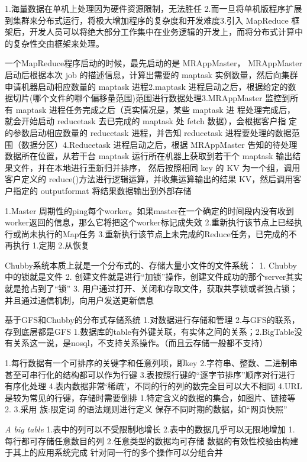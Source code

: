 \documentclass[twoside]{ctexart}
\begin{document}
\begin{multicols}{2}
  1.海量数据在单机上处理因为硬件资源限制，无法胜任 2.而一旦将单机版程序扩展到集群来分布式运行，将极大增加程序的复杂度和开发难度3.引入 MapReduce 框架后，开发人员可以将绝大部分工作集中在业务逻辑的开发上，而将分布式计算中的复杂性交由框架来处理。
  
  一个MapReduce程序启动的时候，最先启动的是 MRAppMaster， MRAppMaster 启动后根据本次 job 的描述信息，计算出需要的 maptask 实例数量，然后向集群申请机器启动相应数量的 maptask 进程2.maptask 进程启动之后，根据给定的数据切片(哪个文件的哪个偏移量范围)范围进行数据处理3.MRAppMaster 监控到所有 maptask 进程任务完成之后（真实情况是，某些 maptask 进 程处理完成后，就会开始启动 reducetask 去已完成的 maptask 处 fetch 数据），会根据客户指 定的参数启动相应数量的 reducetask 进程，并告知 reducetask 进程要处理的数据范围（数据分区）4.Reducetask 进程启动之后，根据 MRAppMaster 告知的待处理数据所在位置，从若干台 maptask 运行所在机器上获取到若干个 maptask 输出结果文件，并在本地进行重新归并排序， 然后按照相同 key 的 KV 为一个组，调用客户定义的 reduce()方法进行逻辑运算，并收集运算输出的结果 KV，然后调用客户指定的 outputformat 将结果数据输出到外部存储

   1.Master 周期性的ping每个worker。如果master在一个确定的时间段内没有收到worker返回的信息，那么它将把这个worker标记成失效 2.重新执行该节点上已经执行或尚未执行的Map任务 3.重新执行该节点上未完成的Reduce任务，已完成的不再执行   1.定期 2.从恢复

    Chubby系统本质上就是一个分布式的、存储大量小文件的文件系统：
    1. Chubby中的锁就是文件
    2. 创建文件就是进行“加锁”操作，创建文件成功的那个server其实就是抢占到了“锁”
    3. 用户通过打开、关闭和存取文件，获取共享锁或者独占锁；并且通过通信机制，向用户发送更新信息
    
  
    基于GFS和Chubby的分布式存储系统 1.对数据进行存储和管理 2.与GFS的联系，存到底层都是GFS  1.数据库的table有外键关联，有实体之间的关系；2.BigTable没有关系这一说，是nosql，不支持关系操作。（而且云存储一般都不支持）

    1.每行数据有一个可排序的关键字和任意列项，即key 2.字符串、整数、二进制串甚至可串行化的结构都可以作为行键 3.表按照行键的``逐字节排序''顺序对行进行有序化处理 4.表内数据非常`稀疏'，不同的行的列的数完全目可以大不相同 4.URL是较为常见的行键，存储时需要倒排  1.特定含义的数据的集合，如图片、链接等 2. 3.采用 族:限定词 的语法规则进行定义  保存不同时期的数据，如``网页快照'' 
  
  \emph{A big table} 1.表中的列可以不受限制地增长 2.表中的数据几乎可以无限地增加  1.每行都可存储任意数目的列  2.任意类型的数据均可存储  数据的有效性校验由构建于其上的应用系统完成  针对同一行的多个操作可以分组合并 

\end{multicols}
\end{document}
